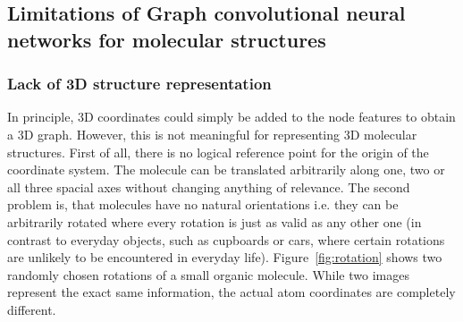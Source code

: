 \subsection{Limitations of Graph convolutional neural networks for molecular structures}
\label{sec:limitations}

\subsubsection{Lack of 3D structure representation}
\label{sec:lack-of-3d-structure}

In principle, 3D coordinates could simply be added to the node features to obtain a 3D graph. However, this is not meaningful for representing 3D molecular structures. First of all, there is no logical reference point for the origin of the coordinate system. The molecule can be translated arbitrarily along one, two or all three spacial axes without changing anything of relevance. The second problem is, that molecules have no natural orientations i.e. they can be arbitrarily rotated where every rotation is just as valid as any other one (in contrast to everyday objects, such as cupboards or cars, where certain rotations are unlikely to be encountered in everyday life). Figure~\ref{fig:rotation} shows two randomly chosen rotations of a small organic molecule. While two images represent the exact same information, the actual atom coordinates are completely different.

